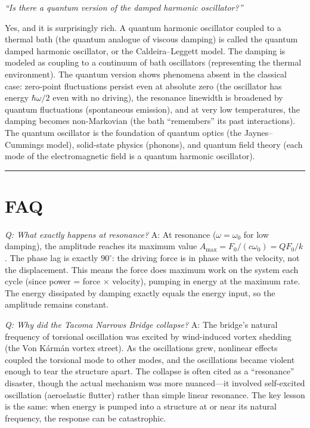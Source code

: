 \textit{``Is there a quantum version of the damped harmonic oscillator?''}

Yes, and it is surprisingly rich. A quantum harmonic oscillator coupled to a thermal bath (the quantum analogue of viscous damping) is called the quantum damped harmonic oscillator, or the Caldeira--Leggett model. The damping is modeled as coupling to a continuum of bath oscillators (representing the thermal environment). The quantum version shows phenomena absent in the classical case: zero-point fluctuations persist even at absolute zero (the oscillator has energy $\hbar\omega/2$ even with no driving), the resonance linewidth is broadened by quantum fluctuations (spontaneous emission), and at very low temperatures, the damping becomes non-Markovian (the bath ``remembers'' its past interactions). The quantum oscillator is the foundation of quantum optics (the Jaynes--Cummings model), solid-state physics (phonons), and quantum field theory (each mode of the electromagnetic field is a quantum harmonic oscillator).

\bigskip
\hrule
\bigskip
\section*{FAQ}

\textit{Q: What exactly happens at resonance?}
A: At resonance ($\omega = \omega_0$ for low damping), the amplitude reaches its maximum value $A_{\text{max}} = F_0/(c\omega_0) = QF_0/k$. The phase lag is exactly $90^\circ$: the driving force is in phase with the velocity, not the displacement. This means the force does maximum work on the system each cycle (since power = force $\times$ velocity), pumping in energy at the maximum rate. The energy dissipated by damping exactly equals the energy input, so the amplitude remains constant.

\textit{Q: Why did the Tacoma Narrows Bridge collapse?}
A: The bridge's natural frequency of torsional oscillation was excited by wind-induced vortex shedding (the Von K\'{a}rm\'{a}n vortex street). As the oscillations grew, nonlinear effects coupled the torsional mode to other modes, and the oscillations became violent enough to tear the structure apart. The collapse is often cited as a ``resonance'' disaster, though the actual mechanism was more nuanced---it involved self-excited oscillation (aeroelastic flutter) rather than simple linear resonance. The key lesson is the same: when energy is pumped into a structure at or near its natural frequency, the response can be catastrophic.

